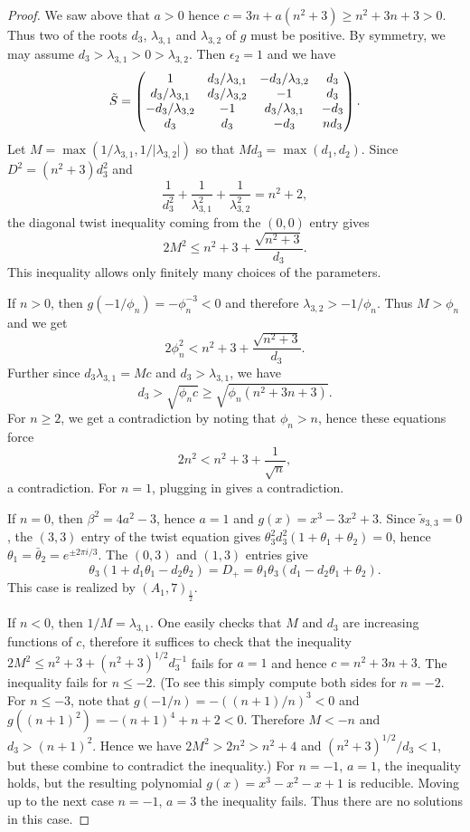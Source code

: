 \documentclass[12pt,psamsfonts]{amsart}
\newcommand{\e}{{\epsilon}}
\numberwithin{equation}{section}
\theoremstyle{definition}
\begin{document}
\begin{proof}
We saw above that $a>0$ hence $c=3n+a(n^2+3)\ge n^2+3n+3>0$. Thus
two of the roots $d_3$, $\lambda_{3,1}$ and $\lambda_{3,2}$ of $g$
must be positive. By symmetry, we may assume
$d_3>\lambda_{3,1}>0>\lambda_{3,2}$. Then $\e_2=1$ and we have
$$\tilde S=\left(\begin{matrix} 1 & d_3/\lambda_{3,1} & -d_3/\lambda_{3,2}
& d_3\cr d_3/\lambda_{3,1} & d_3/\lambda_{3,2} & -1 & d_3\cr
-d_3/\lambda_{3,2} & -1 & d_3/\lambda_{3,1} & - d_3\cr d_3 & d_3 &
- d_3 & nd_3\end{matrix}\right).$$ Let $M=\max(1/\lambda_{3,1},
1/\vert\lambda_{3,2}\vert)$ so that $M d_3=\max(d_1,d_2)$. Since
$D^2=(n^2+3)d_3^2$ and
$$\frac{1}{d_3^2}+\frac{1}{\lambda_{3,1}^2}+\frac{1}{\lambda_{3,2}^2}=
n^2+2,$$ the diagonal twist inequality coming from the $(0,0)$
entry gives
$$2 M^2\le n^2+3+\frac{\sqrt {n^2+3}}{d_3}.$$
This inequality allows only finitely many choices of the
parameters.

If $n>0$, then $g(-1/\phi_n)=-\phi_n^{-3}<0$ and therefore
$\lambda_{3,2}>-1/\phi_n$. Thus $M> \phi_n$ and we get
$$2\phi_n^2 < n^2+3+\frac{\sqrt {n^2+3}}{d_3}.$$
Further since $d_3\lambda_{3,1}=Mc$ and $d_3>\lambda_{3,1}$, we
have
$$d_3>{\sqrt {\phi_n c}}\ge {\sqrt {\phi_n (n^2+3n+3)}}.$$
For $n\ge 2$, we get a contradiction by noting that $\phi_n>n$,
hence these equations force
$$2n^2 < n^2 + 3 + \frac{1}{\sqrt n},$$
a contradiction. For $n=1$, plugging in gives a contradiction.

If $n=0$, then $\beta^2=4a^2-3$, hence $a=1$ and
$g(x)=x^3-3x^2+3$. Since $\tilde s_{3,3}=0$, the $(3,3)$ entry of
the twist equation gives $\theta_3^2 d_3^2
(1+\theta_1+\theta_2)=0$, hence $\theta_1=\bar \theta_2=e^{\pm
2\pi i/3}$. The $(0,3)$ and $(1,3)$ entries give
$$\theta_3(1+d_1 \theta_1 - d_2\theta_2)=D_+=
\theta_1\theta_3 (d_1-d_2\theta_1+\theta_2).$$ This case is
realized by $(A_1,7)_{\frac{1}{2}}$.

If $n<0$, then $1/M=\lambda_{3,1}$. One easily checks that $M$ and
$d_3$ are increasing functions of $c$, therefore it suffices to
check that the inequality $2M^2\le n^2+3 + (n^2+3)^{1/2} d_3^{-1}$
fails for $a=1$ and hence $c=n^2+3n+3$. The inequality fails for
$n\le -2$. (To see this simply compute both sides for $n=-2$. For
$n\le -3$, note that $g(-1/n)=-((n+1)/n)^3<0$ and
$g((n+1)^2)=-(n+1)^4+n+2<0$. Therefore $M< -n$ and $d_3>(n+1)^2$.
Hence we have $2M^2> 2n^2 > n^2+4$ and $(n^2+3)^{1/2}/d_3<1$, but
these combine to contradict the inequality.) For $n=-1$, $a=1$,
the inequality holds, but the resulting polynomial
$g(x)=x^3-x^2-x+1$ is reducible. Moving up to the next case
$n=-1$, $a=3$ the inequality fails. Thus there are no solutions in
this case.


\end{proof}
\end{document}
